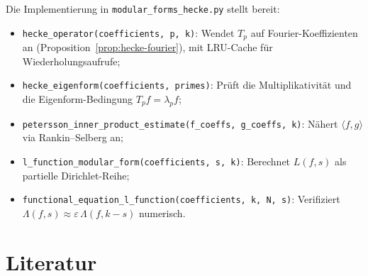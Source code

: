 \documentclass[12pt,a4paper]{amsart}
\theoremstyle{definition}
\begin{document}
Die Implementierung in \texttt{modular\_forms\_hecke.py} stellt bereit:
\begin{itemize}
  \item \texttt{hecke\_operator(coefficients, p, k)}: Wendet $T_p$ auf
        Fourier-Koeffizienten an (Proposition~\ref{prop:hecke-fourier}),
        mit LRU-Cache f\"ur Wiederholungsaufrufe;
  \item \texttt{hecke\_eigenform(coefficients, primes)}: Pr\"uft die
        Multiplikativit\"at und die Eigenform-Bedingung $T_p f = \lambda_p f$;
  \item \texttt{petersson\_inner\_product\_estimate(f\_coeffs, g\_coeffs, k)}:
        N\"ahert $\langle f, g \rangle$ via Rankin--Selberg an;
  \item \texttt{l\_function\_modular\_form(coefficients, s, k)}: Berechnet
        $L(f,s)$ als partielle Dirichlet-Reihe;
  \item \texttt{functional\_equation\_l\_function(coefficients, k, N, s)}:
        Verifiziert $\Lambda(f,s) \approx \varepsilon\,\Lambda(f,k-s)$ numerisch.
\end{itemize}

\section*{Literatur}
\end{document}
